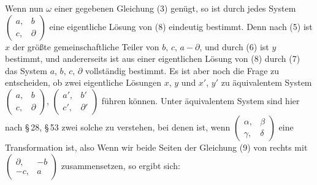 Wenn nun $\omega$ einer gegebenen Gleichung (3) genügt, so ist durch
jedes System $\begin{pmatrix} a, & b\\ c, & \partial \end{pmatrix}$
eine eigentliche Lösung von (8) eindeutig bestimmt. Denn nach (5) ist
$x$ der größte gemeinschaftliche Teiler von $b$, $c$, $a-\partial$, und
durch (6) ist $y$ bestimmt, und andererseits ist aus einer eigentlichen
Lösung von (8) durch (7) das System $a$, $b$, $c$, $\partial$
vollständig bestimmt. Es ist aber noch die Frage zu entscheiden, ob
zwei  eigentliche Lösungen $x$, $y$ und $x'$, $y'$ zu
äquivalentem System $\begin{pmatrix} a, & b\\ c, & \partial
\end{pmatrix}$, $\begin{pmatrix} a', & b'\\ c', & \partial'
\end{pmatrix}$ führen können. Unter äquivalentem System sind hier nach
\S\,28, \S\,53 zwei solche zu verstehen, bei denen
ist, wenn $\begin{pmatrix} \alpha, & \beta\\ \gamma, & \delta
\end{pmatrix}$ eine  Transformation ist, also
Wenn wir beide Seiten der Gleichung (9) von rechts mit
$\begin{pmatrix} \partial, & -b\\ -c, & a \end{pmatrix}$
zusammensetzen, so ergibt sich:
